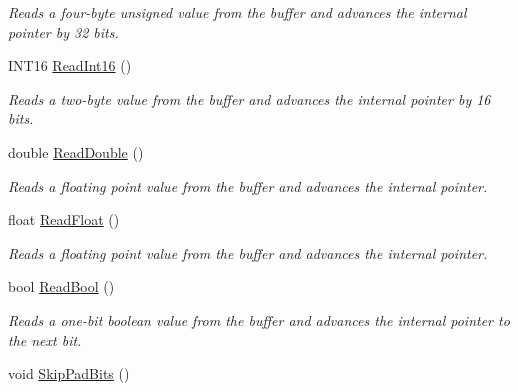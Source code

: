 \begin{DoxyCompactItemize}
\begin{DoxyCompactList}\small\item\em Reads a four-\/byte unsigned value from the buffer and advances the internal pointer by 32 bits. \end{DoxyCompactList}\item 
\hypertarget{class_rhesus_1_1_messenger_1_1_net_buffer_a50b025d7b8c8e799a19c3cba431812e3}{I\-N\-T16 \hyperlink{class_rhesus_1_1_messenger_1_1_net_buffer_a50b025d7b8c8e799a19c3cba431812e3}{Read\-Int16} ()}\label{class_rhesus_1_1_messenger_1_1_net_buffer_a50b025d7b8c8e799a19c3cba431812e3}

\begin{DoxyCompactList}\small\item\em Reads a two-\/byte value from the buffer and advances the internal pointer by 16 bits. \end{DoxyCompactList}\item 
\hypertarget{class_rhesus_1_1_messenger_1_1_net_buffer_a99908cf96b8a69214e477b0aa94481e4}{double \hyperlink{class_rhesus_1_1_messenger_1_1_net_buffer_a99908cf96b8a69214e477b0aa94481e4}{Read\-Double} ()}\label{class_rhesus_1_1_messenger_1_1_net_buffer_a99908cf96b8a69214e477b0aa94481e4}

\begin{DoxyCompactList}\small\item\em Reads a floating point value from the buffer and advances the internal pointer. \end{DoxyCompactList}\item 
\hypertarget{class_rhesus_1_1_messenger_1_1_net_buffer_a497f6fad97d316edef5ff0184646469e}{float \hyperlink{class_rhesus_1_1_messenger_1_1_net_buffer_a497f6fad97d316edef5ff0184646469e}{Read\-Float} ()}\label{class_rhesus_1_1_messenger_1_1_net_buffer_a497f6fad97d316edef5ff0184646469e}

\begin{DoxyCompactList}\small\item\em Reads a floating point value from the buffer and advances the internal pointer. \end{DoxyCompactList}\item 
\hypertarget{class_rhesus_1_1_messenger_1_1_net_buffer_a3829db0150a4700c80e2f7f688dfe207}{bool \hyperlink{class_rhesus_1_1_messenger_1_1_net_buffer_a3829db0150a4700c80e2f7f688dfe207}{Read\-Bool} ()}\label{class_rhesus_1_1_messenger_1_1_net_buffer_a3829db0150a4700c80e2f7f688dfe207}

\begin{DoxyCompactList}\small\item\em Reads a one-\/bit boolean value from the buffer and advances the internal pointer to the next bit. \end{DoxyCompactList}\item 
\hypertarget{class_rhesus_1_1_messenger_1_1_net_buffer_a0736e0e1bc136c8e2bf3f6eee2798ace}{void \hyperlink{class_rhesus_1_1_messenger_1_1_net_buffer_a0736e0e1bc136c8e2bf3f6eee2798ace}{Skip\-Pad\-Bits} ()}\label{class_rhesus_1_1_messenger_1_1_net_buffer_a0736e0e1bc136c8e2bf3f6eee2798ace}


\end{DoxyCompactItemize}
